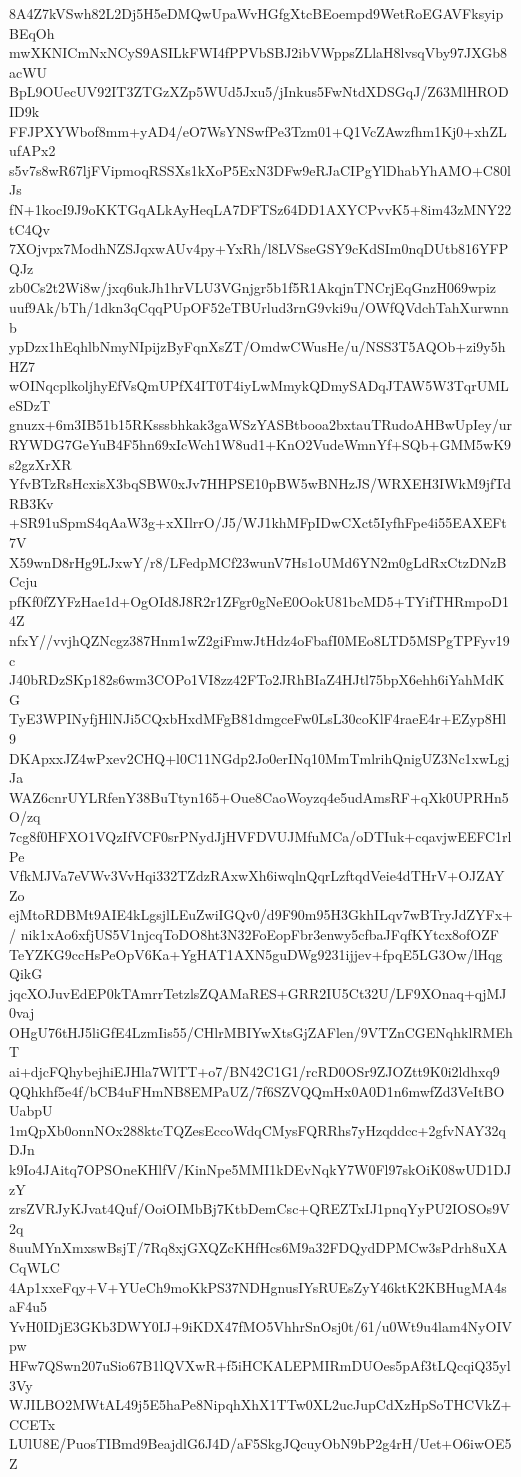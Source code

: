 8A4Z7kVSwh82L2Dj5H5eDMQwUpaWvHGfgXtcBEoempd9WetRoEGAVFksyipBEqOh
mwXKNICmNxNCyS9ASILkFWI4fPPVbSBJ2ibVWppsZLlaH8lvsqVby97JXGb8acWU
BpL9OUecUV92IT3ZTGzXZp5WUd5Jxu5/jInkus5FwNtdXDSGqJ/Z63MlHRODID9k
FFJPXYWbof8mm+yAD4/eO7WsYNSwfPe3Tzm01+Q1VcZAwzfhm1Kj0+xhZLufAPx2
s5v7s8wR67ljFVipmoqRSSXs1kXoP5ExN3DFw9eRJaCIPgYlDhabYhAMO+C80lJs
fN+1kocI9J9oKKTGqALkAyHeqLA7DFTSz64DD1AXYCPvvK5+8im43zMNY22tC4Qv
7XOjvpx7ModhNZSJqxwAUv4py+YxRh/l8LVSseGSY9cKdSIm0nqDUtb816YFPQJz
zb0Cs2t2Wi8w/jxq6ukJh1hrVLU3VGnjgr5b1f5R1AkqjnTNCrjEqGnzH069wpiz
uuf9Ak/bTh/1dkn3qCqqPUpOF52eTBUrlud3rnG9vki9u/OWfQVdchTahXurwnnb
ypDzx1hEqhlbNmyNIpijzByFqnXsZT/OmdwCWusHe/u/NSS3T5AQOb+zi9y5hHZ7
wOINqcplkoljhyEfVsQmUPfX4IT0T4iyLwMmykQDmySADqJTAW5W3TqrUMLeSDzT
gnuzx+6m3IB51b15RKsssbhkak3gaWSzYASBtbooa2bxtauTRudoAHBwUpIey/ur
RYWDG7GeYuB4F5hn69xIcWch1W8ud1+KnO2VudeWmnYf+SQb+GMM5wK9s2gzXrXR
YfvBTzRsHcxisX3bqSBW0xJv7HHPSE10pBW5wBNHzJS/WRXEH3IWkM9jfTdRB3Kv
+SR91uSpmS4qAaW3g+xXIlrrO/J5/WJ1khMFpIDwCXct5IyfhFpe4i55EAXEFt7V
X59wnD8rHg9LJxwY/r8/LFedpMCf23wunV7Hs1oUMd6YN2m0gLdRxCtzDNzBCcju
pfKf0fZYFzHae1d+OgOId8J8R2r1ZFgr0gNeE0OokU81bcMD5+TYifTHRmpoD14Z
nfxY//vvjhQZNcgz387Hnm1wZ2giFmwJtHdz4oFbafI0MEo8LTD5MSPgTPFyv19c
J40bRDzSKp182s6wm3COPo1VI8zz42FTo2JRhBIaZ4HJtl75bpX6ehh6iYahMdKG
TyE3WPINyfjHlNJi5CQxbHxdMFgB81dmgceFw0LsL30coKlF4raeE4r+EZyp8Hl9
DKApxxJZ4wPxev2CHQ+l0C11NGdp2Jo0erINq10MmTmlrihQnigUZ3Nc1xwLgjJa
WAZ6cnrUYLRfenY38BuTtyn165+Oue8CaoWoyzq4e5udAmsRF+qXk0UPRHn5O/zq
7cg8f0HFXO1VQzIfVCF0srPNydJjHVFDVUJMfuMCa/oDTIuk+cqavjwEEFC1rlPe
VfkMJVa7eVWv3VvHqi332TZdzRAxwXh6iwqlnQqrLzftqdVeie4dTHrV+OJZAYZo
ejMtoRDBMt9AIE4kLgsjlLEuZwiIGQv0/d9F90m95H3GkhILqv7wBTryJdZYFx+/
nik1xAo6xfjUS5V1njcqToDO8ht3N32FoEopFbr3enwy5cfbaJFqfKYtcx8ofOZF
TeYZKG9ccHsPeOpV6Ka+YgHAT1AXN5guDWg9231ijjev+fpqE5LG3Ow/lHqgQikG
jqcXOJuvEdEP0kTAmrrTetzlsZQAMaRES+GRR2IU5Ct32U/LF9XOnaq+qjMJ0vaj
OHgU76tHJ5liGfE4LzmIis55/CHlrMBIYwXtsGjZAFlen/9VTZnCGENqhklRMEhT
ai+djcFQhybejhiEJHla7WlTT+o7/BN42C1G1/rcRD0OSr9ZJOZtt9K0i2ldhxq9
QQhkhf5e4f/bCB4uFHmNB8EMPaUZ/7f6SZVQQmHx0A0D1n6mwfZd3VeItBOUabpU
1mQpXb0onnNOx288ktcTQZesEccoWdqCMysFQRRhs7yHzqddcc+2gfvNAY32qDJn
k9Io4JAitq7OPSOneKHlfV/KinNpe5MMI1kDEvNqkY7W0Fl97skOiK08wUD1DJzY
zrsZVRJyKJvat4Quf/OoiOIMbBj7KtbDemCsc+QREZTxIJ1pnqYyPU2IOSOs9V2q
8uuMYnXmxswBsjT/7Rq8xjGXQZcKHfHcs6M9a32FDQydDPMCw3sPdrh8uXACqWLC
4Ap1xxeFqy+V+YUeCh9moKkPS37NDHgnusIYsRUEsZyY46ktK2KBHugMA4saF4u5
YvH0IDjE3GKb3DWY0IJ+9iKDX47fMO5VhhrSnOsj0t/61/u0Wt9u4lam4NyOIVpw
HFw7QSwn207uSio67B1lQVXwR+f5iHCKALEPMIRmDUOes5pAf3tLQcqiQ35yl3Vy
WJILBO2MWtAL49j5E5haPe8NipqhXhX1TTw0XL2ucJupCdXzHpSoTHCVkZ+CCETx
LUlU8E/PuosTIBmd9BeajdlG6J4D/aF5SkgJQcuyObN9bP2g4rH/Uet+O6iwOE5Z
